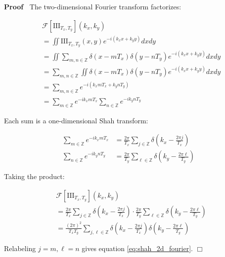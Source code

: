 \documentclass{article}
\newenvironment{proof}{\noindent\textbf{Proof\ }}{\hspace*{\fill}$\Box$\medskip}
\begin{document}
\begin{proof}
  The two-dimensional Fourier transform factorizes:
  
  \begin{align}
    & \mathcal{F} [\text{III}_{T_x, T_y}] (k_x, k_y) \nonumber\\
    & = \iint \text{III}_{T_x, T_y} (x, y) e^{- i (k_x x + k_y y)} dxdy 
    \label{eq:2d_fourier_def}\\
    & = \iint \sum_{m, n \in \mathbb{Z}} \delta (x - mT_x) \delta (y - nT_y)
    e^{- i (k_x x + k_y y)} dxdy  \label{eq:substitute_2d_shah}\\
    & = \sum_{m, n \in \mathbb{Z}} \iint \delta (x - mT_x) \delta (y - nT_y)
    e^{- i (k_x x + k_y y)} dxdy  \label{eq:interchange_sum_integral}\\
    & = \sum_{m, n \in \mathbb{Z}} e^{- i (k_x mT_x + k_y nT_y)} 
    \label{eq:delta_sifting_2d}\\
    & = \sum_{m \in \mathbb{Z}} e^{- ik_x mT_x}  \sum_{n \in \mathbb{Z}} e^{-
    ik_y nT_y}  \label{eq:factor_exponentials}
  \end{align}
  
  Each sum is a one-dimensional Shah transform:
  
  \begin{align}
    \sum_{m \in \mathbb{Z}} e^{- ik_x mT_x} & = \frac{2 \pi}{T_x}  \sum_{j \in
    \mathbb{Z}} \delta \left( k_x - \frac{2 \pi j}{T_x} \right) 
    \label{eq:x_direction_shah}\\
    \sum_{n \in \mathbb{Z}} e^{- ik_y nT_y} & = \frac{2 \pi}{T_y}  \sum_{\ell
    \in \mathbb{Z}} \delta \left( k_y - \frac{2 \pi \ell}{T_y} \right) 
    \label{eq:y_direction_shah}
  \end{align}
  
  Taking the product:
  
  \begin{align}
    & \mathcal{F} [\text{III}_{T_x, T_y}] (k_x, k_y) \nonumber\\
    & = \frac{2 \pi}{T_x}  \sum_{j \in \mathbb{Z}} \delta \left( k_x -
    \frac{2 \pi j}{T_x} \right) \cdot \frac{2 \pi}{T_y}  \sum_{\ell \in
    \mathbb{Z}} \delta \left( k_y - \frac{2 \pi \ell}{T_y} \right) 
    \label{eq:product_1d_transforms}\\
    & = \frac{(2 \pi)^2}{T_x T_y}  \sum_{j, \ell \in \mathbb{Z}} \delta
    \left( k_x - \frac{2 \pi j}{T_x} \right) \delta \left( k_y - \frac{2 \pi
    \ell}{T_y} \right)  \label{eq:final_2d_result}
  \end{align}
  
  Relabeling $j = m, \ell = n$ gives equation \eqref{eq:shah_2d_fourier}.
\end{proof}
\end{document}
